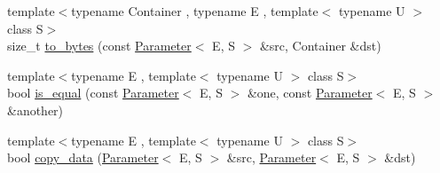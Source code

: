 \begin{DoxyCompactItemize}
{\footnotesize template$<$typename Container , typename E , template$<$ typename U $>$ class S$>$ }\\size\-\_\-t \hyperlink{namespaceLIBKMS__namespace_1_1util_a692e2a914fea260c7098affde01f50ef}{to\-\_\-bytes} (const \hyperlink{classLIBKMS__namespace_1_1Parameter}{Parameter}$<$ E, S $>$ \&src, Container \&dst)
\item 
{\footnotesize template$<$typename E , template$<$ typename U $>$ class S$>$ }\\bool \hyperlink{namespaceLIBKMS__namespace_1_1util_a93964262b5263dd408d800e5acbca34f}{is\-\_\-equal} (const \hyperlink{classLIBKMS__namespace_1_1Parameter}{Parameter}$<$ E, S $>$ \&one, const \hyperlink{classLIBKMS__namespace_1_1Parameter}{Parameter}$<$ E, S $>$ \&another)
\item 
{\footnotesize template$<$typename E , template$<$ typename U $>$ class S$>$ }\\bool \hyperlink{namespaceLIBKMS__namespace_1_1util_ac400a8367bc5921cad6cb8bb062fc170}{copy\-\_\-data} (\hyperlink{classLIBKMS__namespace_1_1Parameter}{Parameter}$<$ E, S $>$ \&src, \hyperlink{classLIBKMS__namespace_1_1Parameter}{Parameter}$<$ E, S $>$ \&dst)
\end{DoxyCompactItemize}


